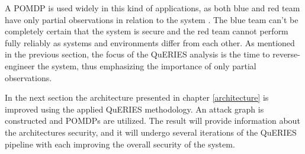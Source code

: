 A POMDP is used widely in this kind of applications, as both blue and
red team have only partial observations in relation to the system
\cite{mcabeeMarkov}. The blue team can't be completely certain that
the system is secure and the red team cannot perform fully reliably as
systems and environments differ from each other. As mentioned in the
previous section, the focus of the QuERIES analysis is the time to
reverse-engineer the system, thus emphasizing the importance of only
partial observations.

In the next section the architecture presented in chapter
\ref{architecture} is improved using the applied QuERIES methodology. An
attack graph is constructed and POMDPs are utilized. The result will
provide information about the architectures security, and it will
undergo several iterations of the QuERIES pipeline with each improving
the overall security of the system.
